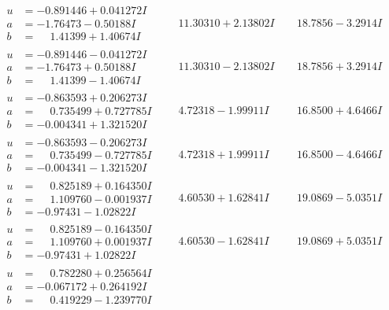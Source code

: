 \documentclass[1p]{elsarticle_modified}
\theoremstyle{definition}
\begin{document}
$$\begin{array}{c|c|c}
\begin{aligned}
u &= -0.891446 + 0.041272 I \\
a &= -1.76473 - 0.50188 I \\
b &= \phantom{-}1.41399 + 1.40674 I\end{aligned}
 & \phantom{-}11.30310 + 2.13802 I & \phantom{-}18.7856 - 3.2914 I \\ \hline\begin{aligned}
u &= -0.891446 - 0.041272 I \\
a &= -1.76473 + 0.50188 I \\
b &= \phantom{-}1.41399 - 1.40674 I\end{aligned}
 & \phantom{-}11.30310 - 2.13802 I & \phantom{-}18.7856 + 3.2914 I \\ \hline\begin{aligned}
u &= -0.863593 + 0.206273 I \\
a &= \phantom{-}0.735499 + 0.727785 I \\
b &= -0.004341 + 1.321520 I\end{aligned}
 & \phantom{-}4.72318 - 1.99911 I & \phantom{-}16.8500 + 4.6466 I \\ \hline\begin{aligned}
u &= -0.863593 - 0.206273 I \\
a &= \phantom{-}0.735499 - 0.727785 I \\
b &= -0.004341 - 1.321520 I\end{aligned}
 & \phantom{-}4.72318 + 1.99911 I & \phantom{-}16.8500 - 4.6466 I \\ \hline\begin{aligned}
u &= \phantom{-}0.825189 + 0.164350 I \\
a &= \phantom{-}1.109760 - 0.001937 I \\
b &= -0.97431 - 1.02822 I\end{aligned}
 & \phantom{-}4.60530 + 1.62841 I & \phantom{-}19.0869 - 5.0351 I \\ \hline\begin{aligned}
u &= \phantom{-}0.825189 - 0.164350 I \\
a &= \phantom{-}1.109760 + 0.001937 I \\
b &= -0.97431 + 1.02822 I\end{aligned}
 & \phantom{-}4.60530 - 1.62841 I & \phantom{-}19.0869 + 5.0351 I \\ \hline\begin{aligned}
u &= \phantom{-}0.782280 + 0.256564 I \\
a &= -0.067172 + 0.264192 I \\
b &= \phantom{-}0.419229 - 1.239770 I\end{aligned}

\end{array}$$
\end{document}
